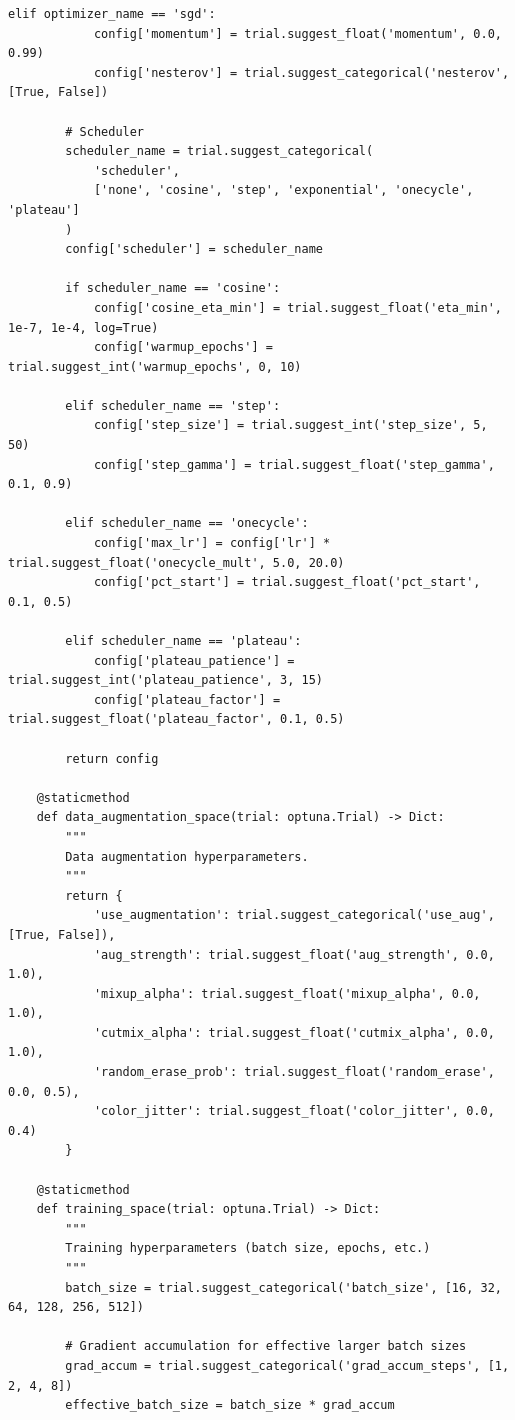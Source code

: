\begin{lstlisting}[style=python, caption=Search space design patterns]
        elif optimizer_name == 'sgd':
            config['momentum'] = trial.suggest_float('momentum', 0.0, 0.99)
            config['nesterov'] = trial.suggest_categorical('nesterov', [True, False])

        # Scheduler
        scheduler_name = trial.suggest_categorical(
            'scheduler',
            ['none', 'cosine', 'step', 'exponential', 'onecycle', 'plateau']
        )
        config['scheduler'] = scheduler_name

        if scheduler_name == 'cosine':
            config['cosine_eta_min'] = trial.suggest_float('eta_min', 1e-7, 1e-4, log=True)
            config['warmup_epochs'] = trial.suggest_int('warmup_epochs', 0, 10)

        elif scheduler_name == 'step':
            config['step_size'] = trial.suggest_int('step_size', 5, 50)
            config['step_gamma'] = trial.suggest_float('step_gamma', 0.1, 0.9)

        elif scheduler_name == 'onecycle':
            config['max_lr'] = config['lr'] * trial.suggest_float('onecycle_mult', 5.0, 20.0)
            config['pct_start'] = trial.suggest_float('pct_start', 0.1, 0.5)

        elif scheduler_name == 'plateau':
            config['plateau_patience'] = trial.suggest_int('plateau_patience', 3, 15)
            config['plateau_factor'] = trial.suggest_float('plateau_factor', 0.1, 0.5)

        return config

    @staticmethod
    def data_augmentation_space(trial: optuna.Trial) -> Dict:
        """
        Data augmentation hyperparameters.
        """
        return {
            'use_augmentation': trial.suggest_categorical('use_aug', [True, False]),
            'aug_strength': trial.suggest_float('aug_strength', 0.0, 1.0),
            'mixup_alpha': trial.suggest_float('mixup_alpha', 0.0, 1.0),
            'cutmix_alpha': trial.suggest_float('cutmix_alpha', 0.0, 1.0),
            'random_erase_prob': trial.suggest_float('random_erase', 0.0, 0.5),
            'color_jitter': trial.suggest_float('color_jitter', 0.0, 0.4)
        }

    @staticmethod
    def training_space(trial: optuna.Trial) -> Dict:
        """
        Training hyperparameters (batch size, epochs, etc.)
        """
        batch_size = trial.suggest_categorical('batch_size', [16, 32, 64, 128, 256, 512])

        # Gradient accumulation for effective larger batch sizes
        grad_accum = trial.suggest_categorical('grad_accum_steps', [1, 2, 4, 8])
        effective_batch_size = batch_size * grad_accum


\end{lstlisting}
